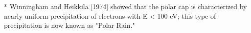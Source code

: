 

* Winningham and Heikkila [1974] showed that the polar cap is
characterized by nearly uniform precipitation of electrons with E < 100
eV; this type of precipitation is now known as "Polar Rain."

